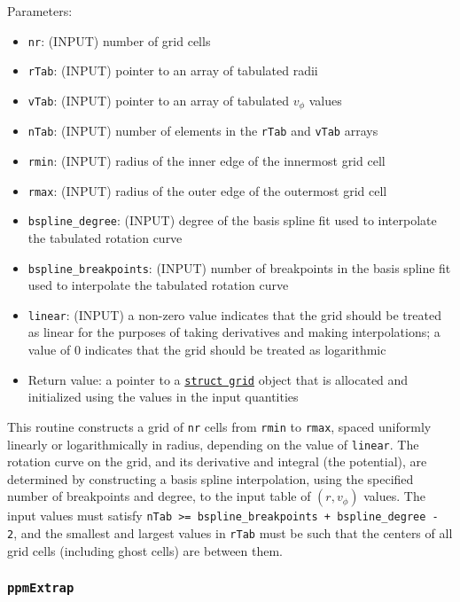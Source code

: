 \documentclass[12pt]{article}
\begin{document}
Parameters:
\begin{itemize}
\item \texttt{nr}: (INPUT) number of grid cells
\item \texttt{rTab}: (INPUT) pointer to an array of tabulated radii
\item \texttt{vTab}: (INPUT) pointer to an array of tabulated $v_\phi$ values
\item \texttt{nTab}: (INPUT) number of elements in the \verb=rTab= and \verb=vTab= arrays
\item \texttt{rmin}: (INPUT) radius of the inner edge of the innermost grid cell
\item \texttt{rmax}: (INPUT) radius of the outer edge of the outermost grid cell
\item \verb=bspline_degree=: (INPUT) degree of the basis spline fit used to interpolate the tabulated rotation curve
\item \verb=bspline_breakpoints=: (INPUT) number of breakpoints in the basis spline fit used to interpolate the tabulated rotation curve
\item \texttt{linear}: (INPUT) a non-zero value indicates that the grid should be treated as linear for the purposes of taking derivatives and making interpolations; a value of 0 indicates that the grid should be treated as logarithmic
\item Return value: a pointer to a \hyperref[sssec:datastructures]{\texttt{struct grid}} object that is allocated and initialized using the values in the input quantities
\end{itemize}

This routine constructs a grid of \verb=nr= cells from \verb=rmin= to \verb=rmax=, spaced uniformly linearly or logarithmically in radius, depending on the value of \verb=linear=. The rotation curve on the grid, and its derivative and integral (the potential), are determined by constructing a basis spline interpolation, using the specified number of breakpoints and degree, to the input table of $(r,v_\phi)$ values. The input values must satisfy \texttt{nTab >= bspline\_breakpoints + bspline\_degree - 2}, and the smallest and largest values in \verb=rTab= must be such that the centers of all grid cells (including ghost cells) are between them.

\subsubsection{\texttt{ppmExtrap}}
\label{sssec:ppmExtrap}
\end{document}
